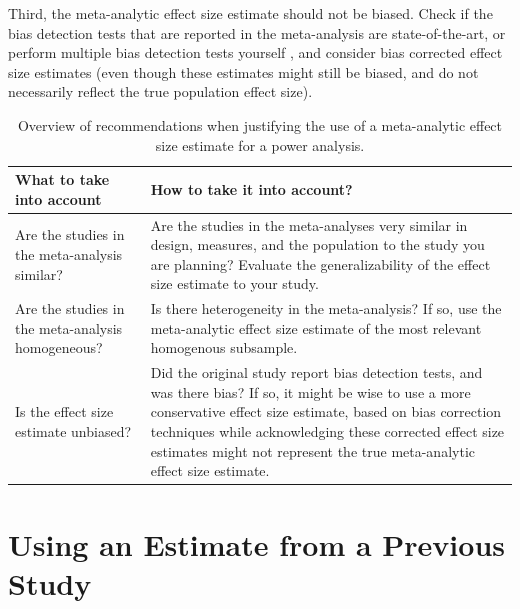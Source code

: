 \documentclass[
  oneside]{book}
\begin{document}
Third, the meta-analytic effect size estimate should not be biased. Check if the bias detection tests that are reported in the meta-analysis are state-of-the-art, or perform multiple bias detection tests yourself \citep{carter_correcting_2019}, and consider bias corrected effect size estimates (even though these estimates might still be biased, and do not necessarily reflect the true population effect size).

\begin{table}

\caption{\label{tab:tablemetajust}Overview of recommendations when justifying the use of a meta-analytic effect size estimate for a power analysis.}
\centering
\begin{tabular}[t]{l|l}
\hline
What to take into account & How to take it into account?\\
\hline
Are the studies in the meta-analysis similar? & Are the studies in the meta-analyses very similar in design, measures, and the population to the study you are planning? Evaluate the generalizability of the effect size estimate to your study.\\
\hline
Are the studies in the meta-analysis homogeneous? & Is there heterogeneity in the meta-analysis? If so, use the meta-analytic effect size estimate of the most relevant homogenous subsample.\\
\hline
Is the effect size estimate unbiased? & Did the original study report bias detection tests, and was there bias? If so, it might be wise to use a more conservative effect size estimate, based on bias correction techniques while acknowledging these corrected effect size estimates might not represent the true meta-analytic effect size estimate.\\
\hline
\end{tabular}
\end{table}

\hypertarget{using-an-estimate-from-a-previous-study}{%
\section{Using an Estimate from a Previous Study}\label{using-an-estimate-from-a-previous-study}}
\end{document}
